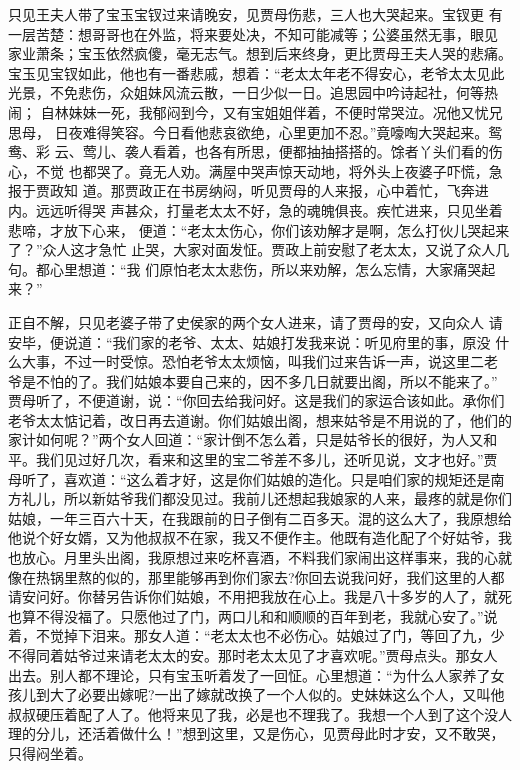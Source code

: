 只见王夫人带了宝玉宝钗过来请晚安，见贾母伤悲，三人也大哭起来。宝钗更
有一层苦楚：想哥哥也在外监，将来要处决，不知可能减等；公婆虽然无事，眼见
家业萧条；宝玉依然疯傻，毫无志气。想到后来终身，更比贾母王夫人哭的悲痛。
宝玉见宝钗如此，他也有一番悲戚，想着：“老太太年老不得安心，老爷太太见此
光景，不免悲伤，众姐妹风流云散，一日少似一日。追思园中吟诗起社，何等热闹；
自林妹妹一死，我郁闷到今，又有宝姐姐伴着，不便时常哭泣。况他又忧兄思母，
日夜难得笑容。今日看他悲哀欲绝，心里更加不忍。”竟嚎啕大哭起来。鸳鸯、彩
云、莺儿、袭人看着，也各有所思，便都抽抽搭搭的。馀者丫头们看的伤心，不觉
也都哭了。竟无人劝。满屋中哭声惊天动地，将外头上夜婆子吓慌，急报于贾政知
道。那贾政正在书房纳闷，听见贾母的人来报，心中着忙，飞奔进内。远远听得哭
声甚众，打量老太太不好，急的魂魄俱丧。疾忙进来，只见坐着悲啼，才放下心来，
便道：“老太太伤心，你们该劝解才是啊，怎么打伙儿哭起来了？”众人这才急忙
止哭，大家对面发怔。贾政上前安慰了老太太，又说了众人几句。都心里想道：“我
们原怕老太太悲伤，所以来劝解，怎么忘情，大家痛哭起来？”

正自不解，只见老婆子带了史侯家的两个女人进来，请了贾母的安，又向众人
请安毕，便说道：“我们家的老爷、太太、姑娘打发我来说：听见府里的事，原没
什么大事，不过一时受惊。恐怕老爷太太烦恼，叫我们过来告诉一声，说这里二老
爷是不怕的了。我们姑娘本要自己来的，因不多几日就要出阁，所以不能来了。”
贾母听了，不便道谢，说：“你回去给我问好。这是我们的家运合该如此。承你们
老爷太太惦记着，改日再去道谢。你们姑娘出阁，想来姑爷是不用说的了，他们的
家计如何呢？”两个女人回道：“家计倒不怎么着，只是姑爷长的很好，为人又和
平。我们见过好几次，看来和这里的宝二爷差不多儿，还听见说，文才也好。”贾
母听了，喜欢道：“这么着才好，这是你们姑娘的造化。只是咱们家的规矩还是南
方礼儿，所以新姑爷我们都没见过。我前儿还想起我娘家的人来，最疼的就是你们
姑娘，一年三百六十天，在我跟前的日子倒有二百多天。混的这么大了，我原想给
他说个好女婿，又为他叔叔不在家，我又不便作主。他既有造化配了个好姑爷，我
也放心。月里头出阁，我原想过来吃杯喜酒，不料我们家闹出这样事来，我的心就
像在热锅里熬的似的，那里能够再到你们家去?你回去说我问好，我们这里的人都
请安问好。你替另告诉你们姑娘，不用把我放在心上。我是八十多岁的人了，就死
也算不得没福了。只愿他过了门，两口儿和和顺顺的百年到老，我就心安了。”说
着，不觉掉下泪来。那女人道：“老太太也不必伤心。姑娘过了门，等回了九，少
不得同着姑爷过来请老太太的安。那时老太太见了才喜欢呢。”贾母点头。那女人
出去。别人都不理论，只有宝玉听着发了一回怔。心里想道：“为什么人家养了女
孩儿到大了必要出嫁呢?一出了嫁就改换了一个人似的。史妹妹这么个人，又叫他
叔叔硬压着配了人了。他将来见了我，必是也不理我了。我想一个人到了这个没人
理的分儿，还活着做什么！”想到这里，又是伤心，见贾母此时才安，又不敢哭，
只得闷坐着。


